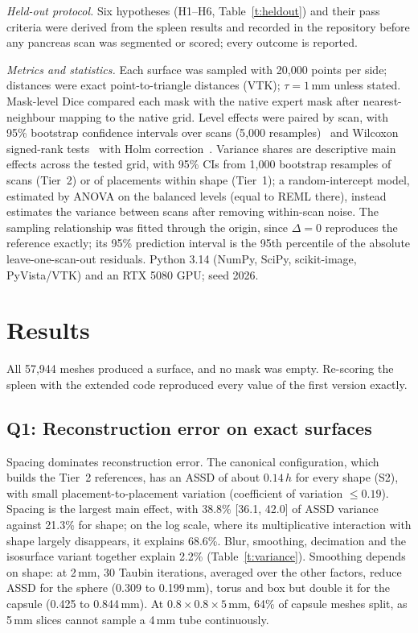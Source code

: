 \documentclass[conference]{IEEEtran}
\newcommand{\mm}{\,mm\xspace}
\begin{document}
\emph{Held-out protocol.} Six hypotheses (H1--H6, Table~\ref{t:heldout}) and their pass criteria were derived from the spleen results and recorded in the repository before any pancreas scan was segmented or scored; every outcome is reported.

\emph{Metrics and statistics.} Each surface was sampled with 20{,}000 points per side; distances were exact point-to-triangle distances (VTK); $\tau=1$\mm unless stated. Mask-level Dice compared each mask with the native expert mask after nearest-neighbour mapping to the native grid. Level effects were paired by scan, with 95\% bootstrap confidence intervals over scans (5{,}000 resamples)~\cite{efron1993bootstrap} and Wilcoxon signed-rank tests~\cite{wilcoxon1945} with Holm correction~\cite{holm1979}. Variance shares are descriptive main effects across the tested grid, with 95\% CIs from 1{,}000 bootstrap resamples of scans (Tier~2) or of placements within shape (Tier~1); a random-intercept model, estimated by ANOVA on the balanced levels (equal to REML there), instead estimates the variance between scans after removing within-scan noise. The sampling relationship was fitted through the origin, since $\Delta=0$ reproduces the reference exactly; its 95\% prediction interval is the 95th percentile of the absolute leave-one-scan-out residuals. Python 3.14 (NumPy, SciPy, scikit-image, PyVista/VTK) and an RTX 5080 GPU; seed 2026.

\section{Results}
All 57{,}944 meshes produced a surface, and no mask was empty. Re-scoring the spleen with the extended code reproduced every value of the first version exactly.

\subsection{Q1: Reconstruction error on exact surfaces}
Spacing dominates reconstruction error. The canonical configuration, which builds the Tier~2 references, has an ASSD of about $0.14\,h$ for every shape (S2), with small placement-to-placement variation (coefficient of variation $\leq0.19$). Spacing is the largest main effect, with 38.8\% [36.1, 42.0] of ASSD variance against 21.3\% for shape; on the log scale, where its multiplicative interaction with shape largely disappears, it explains 68.6\%. Blur, smoothing, decimation and the isosurface variant together explain 2.2\% (Table~\ref{t:variance}). Smoothing depends on shape: at 2\mm, 30 Taubin iterations, averaged over the other factors, reduce ASSD for the sphere (0.309 to 0.199\mm), torus and box but double it for the capsule (0.425 to 0.844\mm). At $0.8\times0.8\times5$\mm, 64\% of capsule meshes split, as 5\mm slices cannot sample a 4\mm tube continuously.
\end{document}

